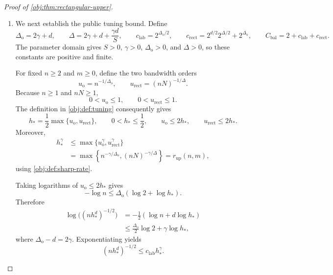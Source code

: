 \documentclass[11pt]{article}
\begin{document}
\begin{proof}[Proof of \cref{obj:thm:rectangular-upper}]
\begin{enumerate}
\item We next establish the public tuning bound. Define
\[
\Delta_{\mathrm{o}}=2\gamma+d,\qquad
\Delta=2\gamma+d+\frac{\gamma d}{S},
\qquad
c_{\mathrm{lab}}=2^{\Delta_{\mathrm{o}}/2},
\qquad
c_{\mathrm{rect}}
=2^{d/2}2^{\Delta/2}+2^{\Delta_{\mathrm{o}}},
\qquad
C_{\mathrm{bal}}=2+c_{\mathrm{lab}}+c_{\mathrm{rect}}.
\]
The parameter domain gives \(S>0\), \(\gamma>0\),
\(\Delta_{\mathrm{o}}>0\), and \(\Delta>0\), so these constants are positive and finite.

For fixed \(n\ge2\) and \(m\ge0\), define the two bandwidth orders
\[
u_{\mathrm{o}}=n^{-1/\Delta_{\mathrm{o}}},
\qquad
u_{\mathrm{rect}}=(nN)^{-1/\Delta}.
\]
Because \(n\ge1\) and \(nN\ge1\),
\[
0<u_{\mathrm{o}}\le1,\qquad
0<u_{\mathrm{rect}}\le1.
\]
The definition in \cref{obj:def:tuning} consequently gives
\[
h_*=\frac12\max\{u_{\mathrm{o}},u_{\mathrm{rect}}\},
\qquad
0<h_*\le\frac12,\qquad
u_{\mathrm{o}}\le2h_*,
\qquad
u_{\mathrm{rect}}\le2h_*.
\]
Moreover,
\[
\begin{aligned}
h_*^\gamma
&\le \max\{u_{\mathrm{o}}^\gamma,u_{\mathrm{rect}}^\gamma\}\\
&=\max\left\{
 n^{-\gamma/\Delta_{\mathrm{o}}},
 (nN)^{-\gamma/\Delta}\right\}
=r_{\mathrm{up}}(n,m),
\end{aligned}
\]
using \cref{obj:def:sharp-rate}.

Taking logarithms of \(u_{\mathrm{o}}\le2h_*\) gives
\[
-\log n
\le\Delta_{\mathrm{o}}(\log2+\log h_*).
\]
Therefore
\[
\begin{aligned}
\log\bigl((nh_*^d)^{-1/2}\bigr)
&=-\frac12(\log n+d\log h_*)\\
&\le\frac{\Delta_{\mathrm{o}}}{2}\log2
   +\gamma\log h_*,
\end{aligned}
\]
where \(\Delta_{\mathrm{o}}-d=2\gamma\). Exponentiating yields
\[
(nh_*^d)^{-1/2}\le c_{\mathrm{lab}}h_*^\gamma.
\]%


\end{enumerate}
\end{proof}
\end{document}
